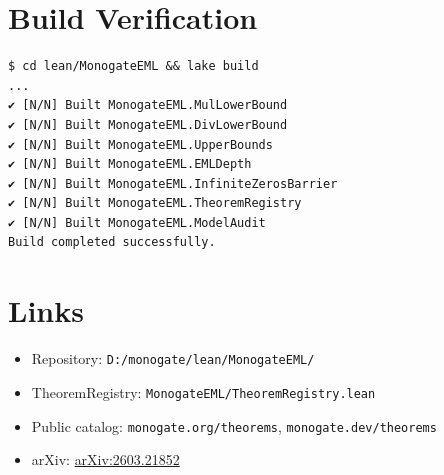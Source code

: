 \documentclass[11pt]{article}
\begin{document}
\section{Build Verification}

\begin{verbatim}
$ cd lean/MonogateEML && lake build
...
✔ [N/N] Built MonogateEML.MulLowerBound
✔ [N/N] Built MonogateEML.DivLowerBound
✔ [N/N] Built MonogateEML.UpperBounds
✔ [N/N] Built MonogateEML.EMLDepth
✔ [N/N] Built MonogateEML.InfiniteZerosBarrier
✔ [N/N] Built MonogateEML.TheoremRegistry
✔ [N/N] Built MonogateEML.ModelAudit
Build completed successfully.
\end{verbatim}

\section*{Links}

\begin{itemize}
\item Repository: \texttt{D:/monogate/lean/MonogateEML/}
\item TheoremRegistry: \texttt{MonogateEML/TheoremRegistry.lean}
\item Public catalog: \texttt{monogate.org/theorems}, \texttt{monogate.dev/theorems}
\item arXiv: \href{https://arxiv.org/abs/2603.21852}{arXiv:2603.21852}
\end{itemize}
\end{document}
